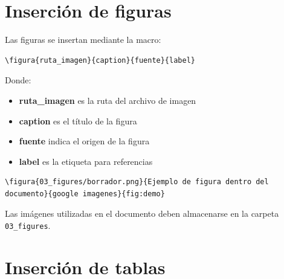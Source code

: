 
\section{Inserción de figuras}

Las figuras se insertan mediante la macro:

\begin{lstlisting}[caption={Macro de inserción de figuras},label={code:figura}]
\figura{ruta_imagen}{caption}{fuente}{label}
\end{lstlisting}


Donde:

\begin{itemize}

\item \textbf{ruta\_imagen} es la ruta del archivo de imagen
\item \textbf{caption} es el título de la figura
\item \textbf{fuente} indica el origen de la figura
\item \textbf{label} es la etiqueta para referencias

\end{itemize}




\begin{lstlisting}[caption={Ejemplo de inserción de figura},label={code:figuraej}]
\figura{03_figures/borrador.png}{Ejemplo de figura dentro del documento}{google imagenes}{fig:demo}
\end{lstlisting}




\begin{notebox}
Las imágenes utilizadas en el documento deben
almacenarse en la carpeta \texttt{03\_figures}.
\end{notebox}




\section{Inserción de tablas}

